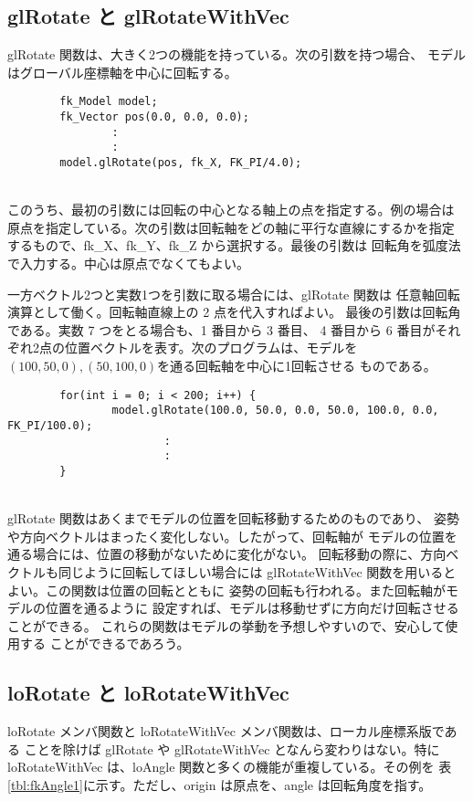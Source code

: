 \subsection{glRotate と glRotateWithVec}
glRotate 関数は、大きく2つの機能を持っている。次の引数を持つ場合、
モデルはグローバル座標軸を中心に回転する。
\\
\begin{breakbox}
\begin{verbatim}
        fk_Model model;
        fk_Vector pos(0.0, 0.0, 0.0);
                :
                :
        model.glRotate(pos, fk_X, FK_PI/4.0);
\end{verbatim}
\end{breakbox}
~ \\
このうち、最初の引数には回転の中心となる軸上の点を指定する。例の場合は
原点を指定している。次の引数は回転軸をどの軸に平行な直線にするかを指定
するもので、fk\_X、fk\_Y、fk\_Z から選択する。最後の引数は
回転角を弧度法で入力する。中心は原点でなくてもよい。

一方ベクトル2つと実数1つを引数に取る場合には、glRotate 関数は
任意軸回転演算として働く。回転軸直線上の 2 点を代入すればよい。
最後の引数は回転角である。実数 7 つをとる場合も、1 番目から 3 番目、
4 番目から 6 番目がそれぞれ2点の位置ベクトルを表す。次のプログラムは、モデルを
\((100, 50, 0), (50, 100, 0)\)を通る回転軸を中心に1回転させる
ものである。
\\
\begin{breakbox}
\begin{verbatim}
        for(int i = 0; i < 200; i++) {
                model.glRotate(100.0, 50.0, 0.0, 50.0, 100.0, 0.0, FK_PI/100.0);
                        :
                        :
        }
\end{verbatim}
\end{breakbox}
~ \\
glRotate 関数はあくまでモデルの位置を回転移動するためのものであり、
姿勢や方向ベクトルはまったく変化しない。したがって、回転軸が
モデルの位置を通る場合には、位置の移動がないために変化がない。
回転移動の際に、方向ベクトルも同じように回転してほしい場合には
glRotateWithVec 関数を用いるとよい。この関数は位置の回転とともに
姿勢の回転も行われる。また回転軸がモデルの位置を通るように
設定すれば、モデルは移動せずに方向だけ回転させることができる。
これらの関数はモデルの挙動を予想しやすいので、安心して使用する
ことができるであろう。
\subsection{loRotate と loRotateWithVec}
loRotate メンバ関数と loRotateWithVec メンバ関数は、ローカル座標系版である
ことを除けば glRotate や glRotateWithVec となんら変わりはない。特に
loRotateWithVec は、loAngle 関数と多くの機能が重複している。その例を
表\ref{tbl:fkAngle1}に示す。ただし、origin は原点を、angle は回転角度を指す。

